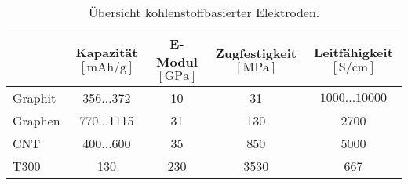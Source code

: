 \begin{table}[ht]
    \centering
    \caption{Übersicht kohlenstoffbasierter Elektroden.}
    \begin{tabular}[t]{lcccc}
    \toprule
    &\makecell{Kapazität\\$\left[ \si{\mA \hour \per \g} \right]$} %
    &\makecell{E-Modul\\ $\left[ \si{\GPa} \right]$}
    &\makecell{Zugfestigkeit\\ $\left[ \si{\MPa} \right]$}
    &\makecell{Leitfähigkeit\\ $\left[ \si{\siemens \per \cm} \right]$}
    \\
    \midrule
    Graphit
        &356...372 \cite{Winter1998} %
        &10 \cite{Lin2023} %
        &31 \cite{Lin2023} %
        &$1000...10000$ \cite{Wang2021} %
        \\
    Graphen
        &770...1115 \cite{Wu2011} %
        &31 \cite{Lin2023}  %
        &130 \cite{Lin2023} %
        &2700 \cite{Murata2019} %
        \\
    CNT
        &400...600 \cite{Boaretto2020}
        &35 \cite{Kim2017}
        &850 \cite{Kim2017}
        &5000 \cite{Charlier2007}
        \\
    T300
        &130 \cite{Kjell2011}
        &230 \cite{Kjell2011}
        &3530 \cite{Kjell2011}
        &667\cite{Kjell2011}

\end{tabular}
\end{table}

